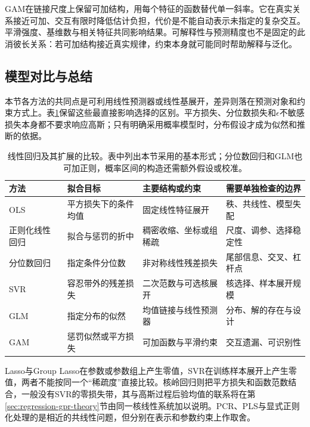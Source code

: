 GAM在链接尺度上保留可加结构，用每个特征的函数替代单一斜率。它在真实关系接近可加、交互有限时降低估计负担，代价是不能自动表示未指定的复杂交互。平滑强度、基维数与相关特征共同影响结果。可解释性与预测精度也不是固定的此消彼长关系：若可加结构接近真实规律，约束本身就可能同时帮助解释与泛化。

\subsection{模型对比与总结}
\label{sec:regression-linear-summary}

本节各方法的共同点是可利用线性预测器或线性基展开，差异则落在预测对象和约束方式上。表\ref{tab:regression-linear-comparison}保留这些最直接影响选择的区别。平方损失、分位数损失和$\epsilon$不敏感损失本身都不要求响应高斯；只有明确采用概率模型时，分布假设才成为似然和推断的依据。

\begin{table}[htbp]
  \centering
  \begin{tabularx}{\linewidth}{@{}l>{\RaggedRight\arraybackslash}X>{\RaggedRight\arraybackslash}X>{\RaggedRight\arraybackslash}X@{}}
    \toprule
    方法 & 拟合目标 & 主要结构或约束 & 需要单独检查的边界\\
    \midrule
    OLS & 平方损失下的条件均值 & 固定线性特征展开 & 秩、共线性、模型失配\\
    正则化线性回归 & 拟合与惩罚的折中 & 稠密收缩、坐标或组稀疏 & 尺度、调参、选择稳定性\\
    分位数回归 & 指定条件分位数 & 非对称线性残差损失 & 尾部信息、交叉、杠杆点\\
    SVR & 容忍带外的残差损失 & 二次范数与可选核展开 & 核选择、样本展开规模\\
    GLM & 指定分布的似然 & 均值链接与线性预测器 & 分布、解的存在与设计\\
    GAM & 惩罚似然或平方损失 & 可加函数与平滑约束 & 交互遗漏、可识别性\\
    \bottomrule
  \end{tabularx}
  \caption{线性回归及其扩展的比较。表中列出本节采用的基本形式；分位数回归和GLM也可加正则，概率区间的构造还需额外假设或校准。}
  \label{tab:regression-linear-comparison}
\end{table}

Lasso与Group Lasso在参数或参数组上产生零值，SVR在训练样本展开上产生零值，两者不能按同一个“稀疏度”直接比较。核岭回归则把平方损失和函数范数结合，一般没有SVR的零损失带，其与高斯过程后验均值的联系将在第\ref{sec:regression-gpr-theory}节由同一核线性系统加以说明。PCR、PLS与显式正则化处理的是相近的共线性问题，但分别在表示和参数约束上作取舍。

